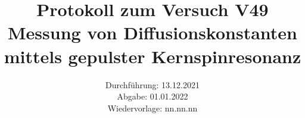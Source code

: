 \titlehead{\texttt{[image: resources/logo.jpg]}}
\title{Protokoll zum Versuch V49 \\ Messung von Diffusionskonstanten mittels gepulster Kernspinresonanz }
\date{Durchführung: 13.12.2021 \\ Abgabe: 01.01.2022 \\ Wiedervorlage: nn.nn.nn }

